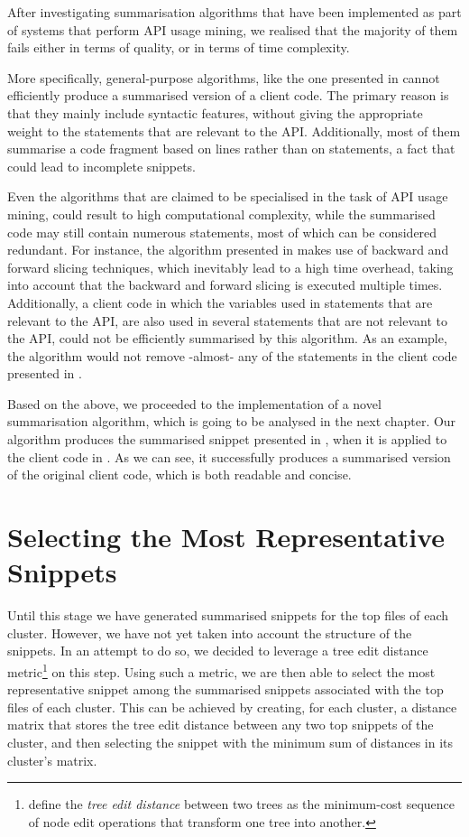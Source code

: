 After investigating summarisation algorithms that have been implemented as part of systems that perform API usage mining, we realised that the majority of them fails either in terms of quality, or in terms of time complexity.

More specifically, general-purpose algorithms, like the one presented in \cite{Ying:2013} cannot efficiently produce a summarised version of a client code. The primary reason is that they mainly include syntactic features, without giving the appropriate weight to the statements that are relevant to the API. Additionally, most of them summarise a code fragment based on lines rather than on statements, a fact that could lead to incomplete snippets.

Even the algorithms that are claimed to be specialised in the task of API usage mining, could result to high computational complexity, while the summarised code may still contain numerous statements, most of which can be considered redundant. For instance, the algorithm presented in \cite{Montandon:2013} makes use of backward and forward slicing techniques, which inevitably lead to a high time overhead, taking into account that the backward and forward slicing is executed multiple times. Additionally, a client code in which the variables used in statements that are relevant to the API, are also used in several statements that are not relevant to the API, could not be efficiently summarised by this algorithm. As an example, the algorithm would not remove -almost- any of the statements in the client code presented in .

Based on the above, we proceeded to the implementation of a novel summarisation algorithm, which is going to be analysed in the next chapter. Our algorithm produces the summarised snippet presented in , when it is applied to the client code in . As we can see, it successfully produces a summarised version of the original client code, which is both readable and concise.


\section{Selecting the Most Representative Snippets}
\label{sec:select-snippet}

Until this stage we have generated summarised snippets for the top files of each cluster. However, we have not yet taken into account the structure of the snippets. In an attempt to do so, we decided to leverage a tree edit distance metric\footnote{ \cite{Pawlik:2016} define the \textit{tree edit distance} between two trees as the minimum-cost sequence of node edit operations that transform one tree into another.} on this step. Using such a metric, we are then able to select the most representative snippet among the summarised snippets associated with the top files of each cluster. This can be achieved by creating, for each cluster, a distance matrix that stores the tree edit distance between any two top snippets of the cluster, and then selecting the snippet with the minimum sum of distances in its cluster's matrix.

